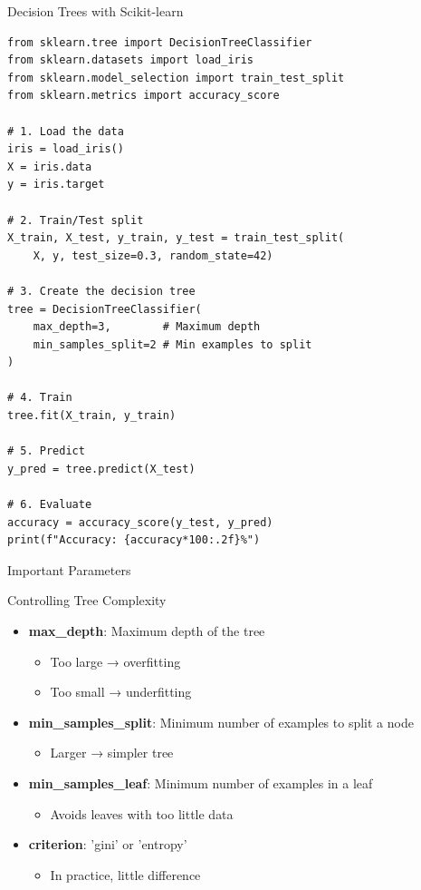 \documentclass[aspectratio=169]{beamer}
\begin{document}
\begin{frame}[fragile]{Decision Trees with Scikit-learn}
\begin{lstlisting}
from sklearn.tree import DecisionTreeClassifier
from sklearn.datasets import load_iris
from sklearn.model_selection import train_test_split
from sklearn.metrics import accuracy_score

# 1. Load the data
iris = load_iris()
X = iris.data
y = iris.target

# 2. Train/Test split
X_train, X_test, y_train, y_test = train_test_split(
    X, y, test_size=0.3, random_state=42)

# 3. Create the decision tree
tree = DecisionTreeClassifier(
    max_depth=3,        # Maximum depth
    min_samples_split=2 # Min examples to split
)

# 4. Train
tree.fit(X_train, y_train)

# 5. Predict
y_pred = tree.predict(X_test)

# 6. Evaluate
accuracy = accuracy_score(y_test, y_pred)
print(f"Accuracy: {accuracy*100:.2f}%")
\end{lstlisting}
\end{frame}

\begin{frame}{Important Parameters}
\begin{block}{Controlling Tree Complexity}
\begin{itemize}
    \item \textbf{max\_depth}: Maximum depth of the tree
    \begin{itemize}
        \item Too large → overfitting
        \item Too small → underfitting
    \end{itemize}
    
    \item \textbf{min\_samples\_split}: Minimum number of examples to split a node
    \begin{itemize}
        \item Larger → simpler tree
    \end{itemize}
    
    \item \textbf{min\_samples\_leaf}: Minimum number of examples in a leaf
    \begin{itemize}
        \item Avoids leaves with too little data
    \end{itemize}
    
    \item \textbf{criterion}: 'gini' or 'entropy'
    \begin{itemize}
        \item In practice, little difference
    \end{itemize}
\end{itemize}
\end{block}
\end{frame}
\end{document}
